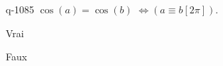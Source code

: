 \begin{truefalse}{q-1085}
$\cos(a)=\cos(b)$  $\Leftrightarrow \left(a\equiv b [2\pi]\right)$.
\item Vrai
\item* Faux
\end{truefalse}

